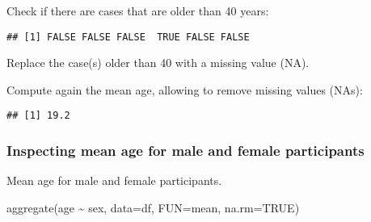 \documentclass[
]{article}
\newenvironment{Shaded}{\begin{snugshade}}{\end{snugshade}}
\newcommand{\AttributeTok}[1]{\textcolor[rgb]{0.77,0.63,0.00}{#1}}
\newcommand{\ConstantTok}[1]{\textcolor[rgb]{0.00,0.00,0.00}{#1}}
\newcommand{\DecValTok}[1]{\textcolor[rgb]{0.00,0.00,0.81}{#1}}
\newcommand{\FunctionTok}[1]{\textcolor[rgb]{0.00,0.00,0.00}{#1}}
\newcommand{\NormalTok}[1]{#1}
\newcommand{\OtherTok}[1]{\textcolor[rgb]{0.56,0.35,0.01}{#1}}
\newcommand{\SpecialCharTok}[1]{\textcolor[rgb]{0.00,0.00,0.00}{#1}}
\begin{document}
Check if there are cases that are older than 40 years:

\begin{Shaded}
\end{Shaded}

\begin{verbatim}
## [1] FALSE FALSE FALSE  TRUE FALSE FALSE
\end{verbatim}

Replace the case(s) older than 40 with a missing value (NA).

\begin{Shaded}
\end{Shaded}

Compute again the mean age, allowing to remove missing values (NAs):

\begin{Shaded}
\end{Shaded}

\begin{verbatim}
## [1] 19.2
\end{verbatim}

\hypertarget{inspecting-mean-age-for-male-and-female-participants}{%
\subsubsection{Inspecting mean age for male and female
participants}\label{inspecting-mean-age-for-male-and-female-participants}}

Mean age for male and female participants.

\begin{Shaded}
\begin{Highlighting}[]
\FunctionTok{aggregate}\NormalTok{(age }\SpecialCharTok{\textasciitilde{}}\NormalTok{ sex, }\AttributeTok{data=}\NormalTok{df, }\AttributeTok{FUN=}\NormalTok{mean, }\AttributeTok{na.rm=}\ConstantTok{TRUE}\NormalTok{)}
\end{Highlighting}
\end{Shaded}
\end{document}
